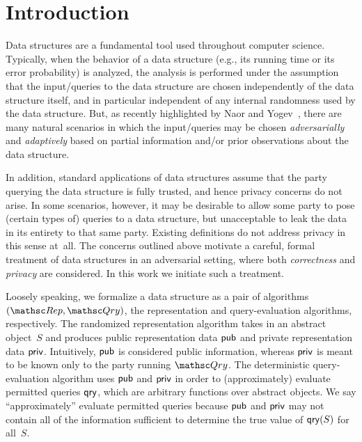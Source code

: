\section{Introduction}
\label{sec:intro}

Data structures are a fundamental tool used throughout computer
science. Typically, when the behavior of a data structure (e.g., its
running time or its error probability) is analyzed, the analysis is
performed under the assumption that the input/queries to the data
structure are chosen independently of the data structure itself, and
in particular independent of any internal randomness used by the
data structure. But, as recently highlighted by Naor and
Yogev~\cite{naor2015bloom}, there are many natural scenarios in
which the input/queries may be chosen \emph{adversarially} and
\emph{adaptively} based on partial information and/or prior
observations about the data structure.

In addition, standard applications of data structures assume that
the party querying the data structure is fully trusted, and hence
privacy concerns do not arise. In some scenarios, however, it may be
desirable to allow some party to pose (certain types of) queries to
a data structure, but unacceptable to leak the data in its entirety
to that same party. Existing definitions do not address privacy in
this sense at~all. The concerns outlined above motivate a careful, formal treatment of data structures in an adversarial setting, 
where both \emph{correctness} and \emph{privacy} are considered. In this work we initiate such a
treatment.  

 Loosely speaking, we formalize a data structure as a pair of algorithms $(\Rep,\Qry)$, the representation and query-evaluation algorithms, respectively.  The randomized representation algorithm takes in an abstract object~$S$ and produces public representation data ${\sf pub}$ and private representation data ${\sf priv}$.  Intuitively, ${\sf pub}$ is considered public information, whereas ${\sf priv}$ is meant to be known only to the party running $\Qry$.  The deterministic query-evaluation algorithm uses ${\sf pub}$ and ${\sf priv}$ in order to (approximately) evaluate permitted queries $\mathsf{qry}$, which are arbitrary functions over abstract objects.  We say ``approximately''  evaluate permitted queries because ${\sf pub}$ and ${\sf priv}$ may not contain all of the information sufficient to determine the true value of $\mathsf{qry}(S)$ for all~$S$.  

